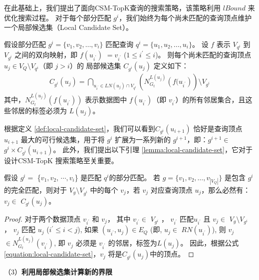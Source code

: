 在此基础上，我们提出了面向CSM-TopK查询的搜索策略，该策略利用 $lBound$ 来优化搜索过程。
对于每个部分匹配 $g^i$，我们始终为每个尚未匹配的查询顶点维护一个局部候选集（Local Candidate Set）。
\begin{definition} [局部候选集] \label{def:local-candidate-set}
    假设部分匹配 $g^i=\{v_1, v_2, \dots, v_i\}$ 匹配查询 $q^i=\{u_1, u_2, \dots, u_i\}$。
    设 $f$ 表示  $V_{q^i}$  到 $V_{g^i}$ 之间的双向映射，即 $f(u_{i^\prime})$ $=v_{i^\prime}$ ($1\leq i^\prime\leq i$)。
    则每个尚未匹配的查询顶点 $u_j \in V_Q\setminus V_{q^i}$（即 $j>i$）的 局部候选集 $C_{g^i}(u_j)$ 定义如下：
    \begin{equation} \label{equation:local-candidate-set}
    \begin{multlined}
    C_{g^i}(u_j) = \bigcap\nolimits_{u_{i^\prime}\in LN(u_j)\cap V_{q^i}} \left(N_{G_t}^{L(u_j)}\left(f(u_{i^\prime}\right)\right) \setminus V_{g^i}
    \end{multlined}
    \end{equation}
    其中，$N_{G_t}^{L(u_j)}(f(u_{i^\prime}))$ 表示数据图中 $f(u_{i^\prime})$（即 $v_{i^\prime}$）的所有邻居集合，且这些邻居的标签必须为 $L(u_j)$。
\end{definition}
根据定义 \ref{def:local-candidate-set}，我们可以看到$C_{g^i}(u_{i+1})$ 恰好是查询顶点 $u_{i+1}$ 最大的可行候选集，用于将 $g^i$ 扩展为一系列新的 $g^{i+1}$，即：$g^{i+1}\in$ $g^i\times C_{g^i}(u_{i+1})$。
此外，我们提出以下引理 \ref{lemma:local-candidate-set}，它对于设计CSM-TopK 搜索策略至关重要。
\begin{lemma} \label{lemma:local-candidate-set}
    假设 $g^i=$ \{$v_1, v_2$, $\cdots, v_i$\} 是匹配 $q^i$的部分匹配。
    若 $g=\{v_1, v_2, \dots, v_{|V_Q|}\}$ 是包含 $g^i$ 的完全匹配，则对于 $V_g\setminus V_{g^i}$ 中的每个 $v_j$，若 $v_j$ 对应查询顶点 $u_j$，那么必然有：
       $v_j\in$ $C_{g^i}(u_j)$。
    \end{lemma}
\begin{proof}
        对于两个数据顶点 $v_{i^\prime}$ 和 $v_j$， 其中 $v_{i^\prime}\in$ $V_{g^i}$ ，  $v_{i^\prime}$ 匹配$u_{i^\prime}$ 
            且 $v_{j}\in$ $V_{g}\setminus V_{g^i}$ ， $v_{j}$ 匹配 $u_j$ ($i^\prime\leq i<j$), 
            如果 $(u_{i^\prime}, u_j)\in E_Q$ (即, $u_j\in$ $RN(u_{i^\prime})$), 则 $v_j$ $\in N_{G_t}^{L(u_j)}(v_{i^\prime})$, 即 $v_j$ 必须是 $v_{i^\prime}$ 的邻居，标签为$L(u_j)$。
            因此，根据公式\ref{equation:local-candidate-set}，$v_j$ 将是$C_{g^i}(u_j)$中的顶点。
\end{proof}
（3）\textbf{利用局部候选集计算新的界限}

